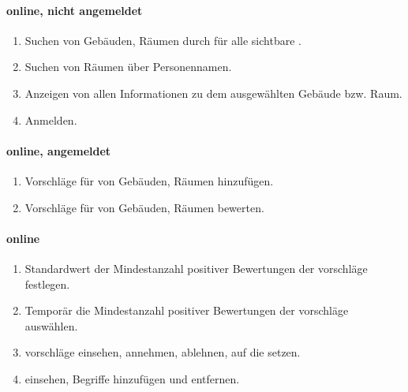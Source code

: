 \paragraph{%
	online, nicht angemeldet}
\begin{enumerate}[label=\textbf{/T\arabic*0/}, align=left]
	\item Suchen von Gebäuden, Räumen durch für alle %
		sichtbare %
		.
	\item Suchen von Räumen über Personennamen.
	\item Anzeigen von allen Informationen zu dem ausgewählten Gebäude bzw. Raum.
	\item Anmelden.
\end{enumerate}

\paragraph{%
	online, angemeldet}
\begin{enumerate}[label=\textbf{/T\arabic*0/}, align=left]
	\item Vorschläge für %
		von Gebäuden, Räumen hinzufügen.
	\item Vorschläge für %
		von Gebäuden, Räumen bewerten.
\end{enumerate}

\paragraph{%
	online}
\begin{enumerate}[label=\textbf{/T\arabic*0/}, align=left]
	\item Standardwert der Mindestanzahl positiver Bewertungen der %
		vorschläge festlegen.
	\item Temporär die Mindestanzahl positiver Bewertungen der %
		vorschläge auswählen.
	\item %
		vorschläge einsehen, annehmen, ablehnen, auf die %
		setzen.
	\item %
		einsehen, Begriffe hinzufügen und entfernen.
\end{enumerate}
